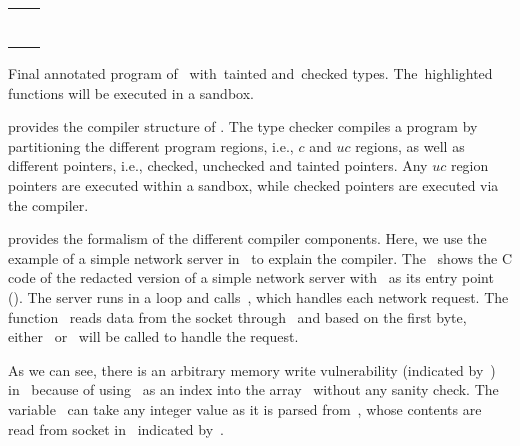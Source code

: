 \begin{listing}[t!]
  \begin{tabular}{c c}
    \begin{minipage}[b]{.22\textwidth}
\inputminted[mathescape, escapeinside=||, fontsize=\tiny{}]{c}{examples/conv1.c}
    \end{minipage} &
    \begin{minipage}[b]{.22\textwidth}
\inputminted[mathescape, highlightlines={1-19}, highlightcolor=taintcolor, escapeinside=||, fontsize=\tiny{}]{c}{examples/conv2.c}
    \end{minipage} %
  \end{tabular}
\caption{Final annotated program of~ with~\textcolor{taintcolor}{tainted} and~\textcolor{checkcolor}{checked} types. The~\colorbox{taintcolor}{highlighted} functions will be executed in a sandbox.}
\label{lst:final}
\end{listing}



 provides the compiler structure of \systemname. The \systemname type checker compiles a \systemname program by partitioning the different program regions, i.e., $c$ and $uc$ regions, as well as different pointers, i.e., checked, unchecked and tainted pointers. Any $uc$ region pointers are executed within a sandbox, while checked pointers are executed via the \checkedc compiler.

 provides the formalism of the different compiler components.
Here,
we use the example of a simple network server in~ to explain the \systemname compiler.
The~ shows the C code of the redacted version of a simple network server with~ as its entry point (\entrypoint).
The server runs in a loop and calls~, which handles each network request.
The function~ reads data from the socket through~ and based on the first byte, either~ or~ will be called to handle the request.

As we can see, there is an arbitrary memory write vulnerability (indicated by~\realbug) in~ because of using~ as an index into the array~ without any sanity check.
The variable~ can take any integer value as it is parsed from~, whose contents are read from socket in~ indicated by~\rootcause.

